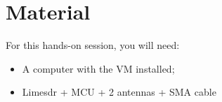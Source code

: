 \section*{Material}

\begin{comment}[couleur = gray!20, arrondi = 0.2, logo=\bcinfo]{}
\vspace{0.2cm}
\end{comment}
For this hands-on session, you will need:
\begin{itemize}
    \item A computer with the VM installed;
    \item Limesdr + MCU + 2 antennas + SMA cable
\end{itemize}
